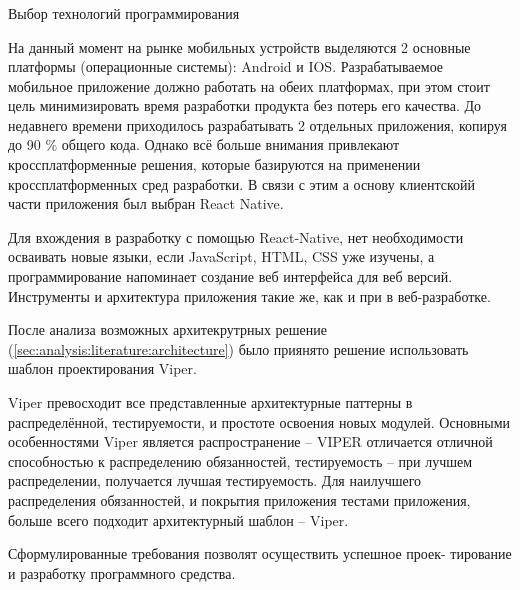 \subsubsection{} Выбор технологий программирования
\label{sec:analysis:specification:language}

На данный момент на рынке мобильных устройств выделяются 2 основные платформы (операционные системы): Android и IOS. Разрабатываемое мобильное приложение должно работать на обеих платформах, при этом стоит цель минимизировать время разработки продукта без потерь его качества. До недавнего времени приходилось разрабатывать 2 отдельных приложения, копируя до 90 \% общего кода. Однако всё больше внимания привлекают кроссплатформенные решения, которые базируются на применении кроссплатформенных сред разработки. В связи с этим а основу клиентскойй части приложения был выбран React Native.

Для вхождения в разработку с помощью React-Native, нет необходимости осваивать новые языки, если JavaScript, HTML, CSS уже изучены, а программирование напоминает
создание веб интерфейса для веб версий. Инструменты и архитектура приложения такие же, как и при в веб-разработке. 

После анализа возможных архитекрутрных решение (\ref{sec:analysis:literature:architecture}) было приянято решение использовать шаблон проектирования Viper.

Viper превосходит все представленные архитектурные паттерны в
распределённой, тестируемости, и простоте освоения новых модулей.
Основными особенностями Viper является распространение – VIPER
отличается отличной способностью к распределению обязанностей,
тестируемость – при лучшем распределении, получается лучшая тестируемость.
Для наилучшего распределения обязанностей,
и покрытия приложения тестами приложения, больше всего подходит
архитектурный шаблон -- Viper. 

Сформулированные требования позволят осуществить успешное проек- тирование и разработку программного средства.

